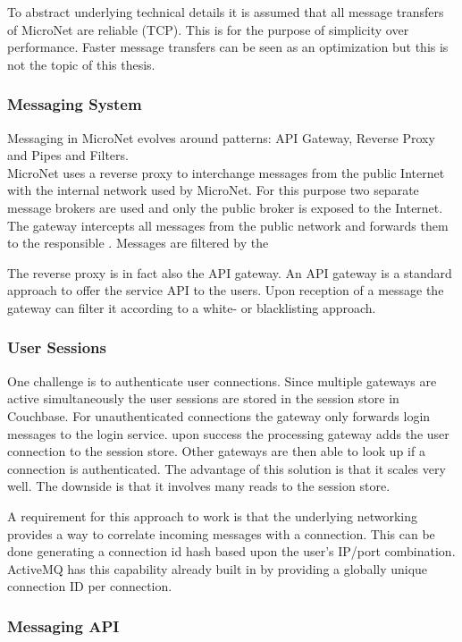 To abstract underlying technical details it is assumed that all message
transfers of MicroNet are reliable (TCP). This is for the purpose of simplicity
over performance. Faster message transfers can be seen as an optimization but
this is not the topic of this thesis.

\subsubsection{Messaging System}

Messaging in MicroNet evolves around patterns: API Gateway, Reverse Proxy and
Pipes and Filters.\\

MicroNet uses a reverse proxy to interchange messages from the public Internet
with the internal network used by MicroNet. For this purpose two separate
message brokers are used and only the public broker is exposed to the Internet.
The gateway intercepts all messages from the public network and forwards them to
the responsible \ms{}. Messages are filtered by the

The reverse proxy is in fact also the API gateway. An API gateway is a standard
approach to offer the service API to the users. Upon reception of a message the
gateway can filter it according to a white- or blacklisting approach.

\subsubsection{User Sessions}

One challenge is to authenticate user connections. Since multiple gateways are
active simultaneously the user sessions are stored in the session store in
Couchbase. For unauthenticated connections the gateway only forwards login
messages to the login service. upon success the processing gateway adds the user
connection to the session store. Other gateways are then able to look up if a
connection is authenticated. The advantage of this solution is that it scales
very well. The downside is that it involves many reads to the session store.

A requirement for this approach to work is that the underlying networking
provides a way to correlate incoming messages with a connection. This can be
done generating a connection id hash based upon the user's IP/port combination.
ActiveMQ has this capability already built in by providing a globally unique
connection ID per connection.

\subsubsection{Messaging API}

